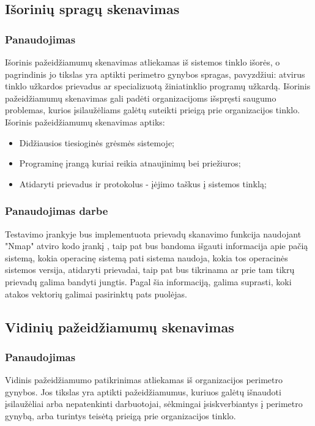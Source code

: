 \documentclass[a4paper,12pt,fleqn]{article}
\begin{document}
\subsection{Išorinių spragų skenavimas}
\label{sec:example}

\subsubsection{Panaudojimas}
Išorinis pažeidžiamumų skenavimas atliekamas iš sistemos tinklo išorės, o pagrindinis jo tikslas yra aptikti perimetro gynybos spragas, pavyzdžiui: atvirus tinklo užkardos prievadus ar specializuotą žiniatinklio programų užkardą. Išorinis pažeidžiamumų skenavimas gali padėti organizacijoms išspręsti saugumo problemas, kurios įsilaužėliams galėtų suteikti prieigą prie organizacijos tinklo.
\newline
Išorinis pažeidžiamumų skenavimas aptiks:
\begin{itemize}
	\item Didžiausios tiesioginės grėsmės sistemoje;
	\item Programinę įrangą kuriai reikia atnaujinimų bei priežiuros;
	\item Atidaryti prievadus ir protokolus - įėjimo taškus į sistemos tinklą;
\end{itemize}

\subsubsection{Panaudojimas darbe}
\label{sec:data}
Testavimo įrankyje bus implementuota prievadų skanavimo funkcija naudojant "Nmap" atviro kodo įrankį , taip pat bus bandoma išgauti informacija apie pačią sistemą, kokia operacinę sistemą pati sistema naudoja, kokia tos operacinės sistemos versija, atidaryti prievadai, taip pat bus tikrinama ar prie tam tikrų prievadų galima bandyti jungtis. Pagal šia informaciją, galima suprasti, koki atakos vektorių galimai pasirinktų pats puolėjas.

\subsection{Vidinių pažeidžiamumų skenavimas}
\label{sec:example}

\subsubsection{Panaudojimas}
Vidinis pažeidžiamumo patikrinimas atliekamas iš organizacijos perimetro gynybos. Jos tikslas yra aptikti pažeidžiamumus, kuriuos galėtų išnaudoti įsilaužėliai arba nepatenkinti darbuotojai, sėkmingai įsiskverbiantys į perimetro gynybą, arba turintys teisėtą prieigą prie organizacijos tinklo.
\end{document}
